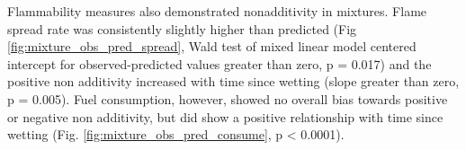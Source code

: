 \documentclass[fire,article,submit,moreauthors,pdftex]{Definitions/mdpi}
\begin{document}
Flammability measures also demonstrated nonadditivity in mixtures.  Flame spread rate was consistently slightly higher than predicted (Fig \ref{fig:mixture_obs_pred_spread}, Wald test of mixed linear model centered intercept for observed-predicted values greater than zero, p = 0.017) and the positive non additivity increased with time since wetting (slope greater than zero, p = 0.005).  Fuel consumption, however, showed no overall bias towards positive or negative non additivity, but did show a positive relationship with time since wetting (Fig. \ref{fig:mixture_obs_pred_consume}, p < 0.0001).








\end{document}
